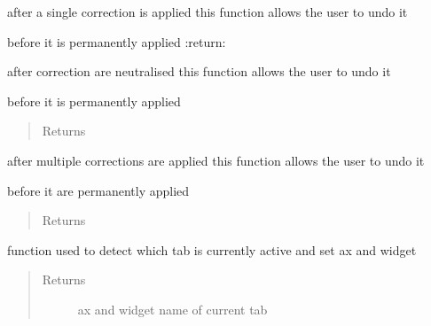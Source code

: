 \documentclass[letterpaper,10pt,english]{sphinxmanual}
\begin{document}
\begin{fulllineitems}
\begin{fulllineitems}
\label{Cormat_main:Cormat_main.CORMAT_GUI.discard_single_point}
after a single correction is applied
this function allows the user to undo it

before it is permanently applied
:return:

\end{fulllineitems}


\begin{fulllineitems}
\label{Cormat_main:Cormat_main.CORMAT_GUI.discard_neutralise_corrections}
after correction are neutralised
this function allows the user to undo it

before it is permanently applied
\begin{quote}\begin{description}
\item[{Returns}] \leavevmode


\end{description}\end{quote}

\end{fulllineitems}


\begin{fulllineitems}
\label{Cormat_main:Cormat_main.CORMAT_GUI.discard_multiple_points}
after multiple corrections are applied
this function allows the user to undo it

before it are permanently applied
\begin{quote}\begin{description}
\item[{Returns}] \leavevmode


\end{description}\end{quote}

\end{fulllineitems}


\begin{fulllineitems}
\label{Cormat_main:Cormat_main.CORMAT_GUI.which_tab}
function used to detect which tab is currently active and set ax and widget
\begin{quote}\begin{description}
\item[{Returns}] \leavevmode
ax and widget name of current tab


\end{description}
\end{quote}
\end{fulllineitems}
\end{fulllineitems}
\end{document}
